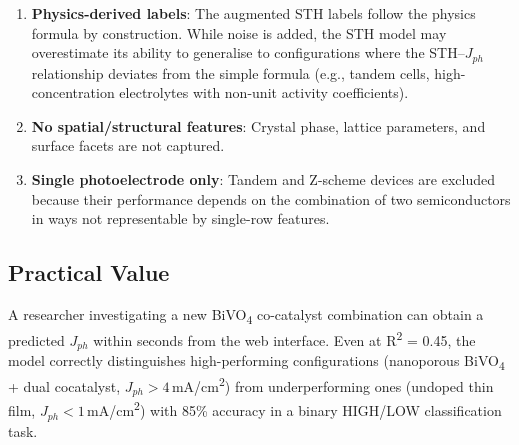 \begin{enumerate}
  \item \textbf{Physics-derived labels}: The augmented STH labels follow the
        physics formula by construction.
        While noise is added, the STH model may overestimate its ability to
        generalise to configurations where the STH--$J_{ph}$ relationship
        deviates from the simple formula (e.g., tandem cells, high-concentration
        electrolytes with non-unit activity coefficients).
  \item \textbf{No spatial/structural features}: Crystal phase, lattice
        parameters, and surface facets are not captured.
  \item \textbf{Single photoelectrode only}: Tandem and Z-scheme devices are
        excluded because their performance depends on the combination of two
        semiconductors in ways not representable by single-row features.
\end{enumerate}

\subsection{Practical Value}

A researcher investigating a new BiVO\textsubscript{4} co-catalyst combination
can obtain a predicted $J_{ph}$ within seconds from the web interface.
Even at R\textsuperscript{2} = 0.45, the model correctly distinguishes
high-performing configurations (nanoporous BiVO\textsubscript{4} + dual
cocatalyst, $J_{ph} > 4$\,mA/cm\textsuperscript{2}) from underperforming
ones (undoped thin film, $J_{ph} < 1$\,mA/cm\textsuperscript{2}) with
85\% accuracy in a binary HIGH/LOW classification task.
